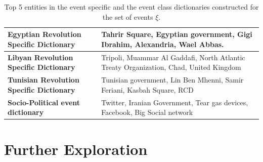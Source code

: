 \begin{table}[htbp]

\caption{\small Top 5 entities in the event specific and the event class dictionaries constructed for the set of events $\xi$.}
\label{tab:table2}
\centering
\begin{tabular}{|l|p{5cm}|}
\hline
\textbf{Egyptian Revolution Specific Dictionary} & Tahrir Square, Egyptian government, Gigi Ibrahim, Alexandria, Wael Abbas. \\
\hline
\textbf{Libyan Revolution Specific Dictionary} & Tripoli, Muammar Al Gaddafi, North Atlantic Treaty Organization, Chad, United Kingdom \\ 
\hline
\textbf{Tunisian Revolution Specific Dictionary} & Tunisian government, Lin Ben Mhenni, Samir Feriani, Kasbah Square, RCD \\ 
\hline
\textbf{Socio-Political event dictionary} & Twitter, Iranian Government, Tear gas devices, Facebook, Big Social network \\ 
\hline
\end{tabular}
\end{table}
\vspace{-3pt}

\section{\label{explore}\textbf{Further Exploration}}

